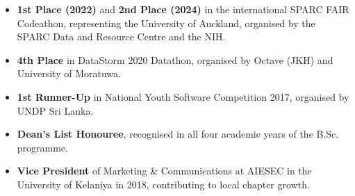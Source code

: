 \documentclass[12pt,a4paper,withhyper]{altacv}
\begin{document}
\medskip

\begin{itemize}
    \item \textbf{1st Place (2022)} and \textbf{2nd Place (2024)} in the international SPARC FAIR Codeathon, representing the University of Auckland, organised by the SPARC Data and Resource Centre and the NIH.
    \item \textbf{4th Place} in DataStorm 2020 Datathon, organised by Octave (JKH) and University of Moratuwa.
    \item \textbf{1st Runner-Up} in National Youth Software Competition 2017, organised by UNDP Sri Lanka.
    \item \textbf{Dean’s List Honouree}, recognised in all four academic years of the B.Sc. programme.

    \item \textbf{Vice President} of Marketing \& Communications at AIESEC in the University of Kelaniya in 2018, contributing to local chapter growth.



\end{itemize}



\medskip






\end{document}
